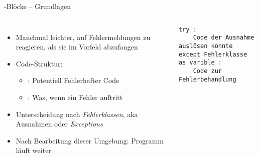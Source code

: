 \begin{frame}[fragile]{-Blöcke -- Grundlagen}
%
\begin{columns}[T]
\begin{itemize}
\item Manchmal leichter, auf Fehlermeldungen zu reagieren, als sie im Vorfeld abzufangen
\item Code-Struktur:
	\begin{itemize}
	\item {}: Potentiell Fehlerhafter Code
	\item {}: Was, wenn ein Fehler auftritt
	\end{itemize}
\item Unterscheidung nach \emph{Fehlerklassen}, aka Ausnahmen oder \emph{Exceptions}
\item Nach Bearbeitung dieser Umgebung: Programm läuft weiter
\end{itemize}
%
\begin{codebox}
\begin{verbatim}
try :
    Code der Ausnahme auslösen könnte
except Fehlerklasse as varible :
    Code zur Fehlerbehandlung
\end{verbatim}
\end{codebox}
\end{columns}
%
\end{frame}


